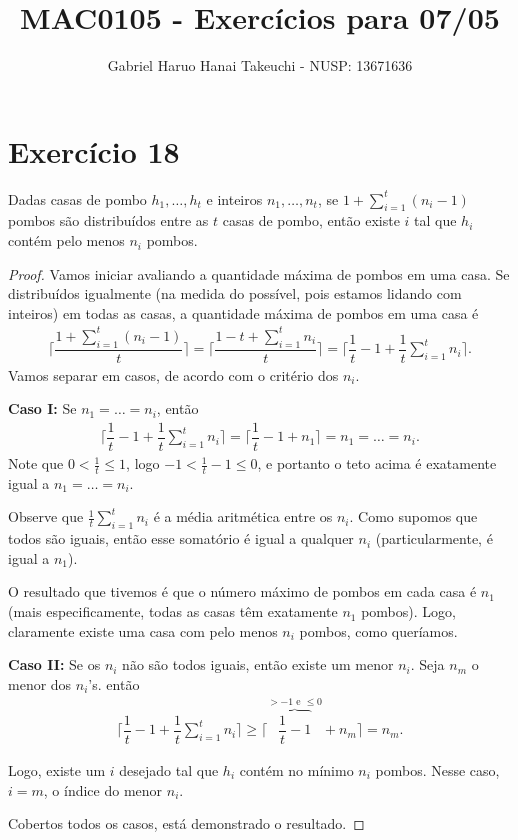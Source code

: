 \documentclass{article}
\author{Gabriel Haruo Hanai Takeuchi - NUSP: 13671636}
\title{MAC0105 - Exercícios para 07/05}
\date{}
\begin{document}
\maketitle

\section*{Exercício 18}
Dadas casas de pombo $h_1,\dots, h_t$ e inteiros $n_1,\dots, n_t$, se $1 + \sum^{t}_{i=1}(n_i - 1)$ pombos são distribuídos entre as $t$ casas de pombo, então existe $i$ tal que $h_i$ contém pelo menos $n_i$ pombos.
\begin{proof}
Vamos iniciar avaliando a quantidade máxima de pombos em uma casa. Se distribuídos igualmente (na medida do possível, pois estamos lidando com inteiros) em todas as casas, a quantidade máxima de pombos em uma casa é
\begin{align*}
    \Big\lceil \dfrac{1 + \sum^{t}_{i=1}(n_i - 1)}{t} \Big\rceil = \Big\lceil \dfrac{1 - t + \sum^{t}_{i=1}n_i}{t} \Big\rceil = \Big\lceil \dfrac{1}{t} - 1 + \dfrac{1}{t}\sum^{t}_{i=1}n_i \Big\rceil .
\end{align*}
Vamos separar em casos, de acordo com o critério dos $n_i$.

\textbf{Caso I:}
Se $n_1 = \dots = n_i$, então
\begin{align*}
    \Big\lceil \dfrac{1}{t} - 1 + \dfrac{1}{t}\sum^{t}_{i=1}n_i \Big\rceil = \Big\lceil \dfrac{1}{t} - 1 + n_1 \Big\rceil = n_1 = \dots = n_i .
\end{align*}
Note que $0 < \frac{1}{t} \leq 1$, logo $ -1 < \frac{1}{t} - 1 \leq 0$, e portanto o teto acima é exatamente igual a $n_1 = \dots = n_i$.

Observe que $\frac{1}{t}\sum^{t}_{i=1}n_i$ é a média aritmética entre os $n_i$.
Como supomos que todos são iguais, então esse somatório é igual a qualquer $n_i$ (particularmente, é igual a $n_1$).

O resultado que tivemos é que o número máximo de pombos em cada casa é $n_1$ (mais especificamente, todas as casas têm exatamente $n_1$ pombos).
Logo, claramente existe uma casa com pelo menos $n_i$ pombos, como queríamos.

\textbf{Caso II:} Se os $n_i$ não são todos iguais, então existe um menor $n_i$.
Seja $n_m$ o menor dos $n_i$'s. então
\begin{align*}
    \Big\lceil \dfrac{1}{t} - 1 + \dfrac{1}{t}\sum^{t}_{i=1}n_i \Big\rceil \geq \Big\lceil \overbrace{\dfrac{1}{t} - 1}^{> -1 \mbox{ e } \leq 0} + n_m \Big\rceil = n_m .
\end{align*}

Logo, existe um $i$ desejado tal que $h_i$ contém no mínimo $n_i$ pombos. Nesse caso, $i=m$, o índice do menor $n_i$.

Cobertos todos os casos, está demonstrado o resultado.
\end{proof}
\end{document}
